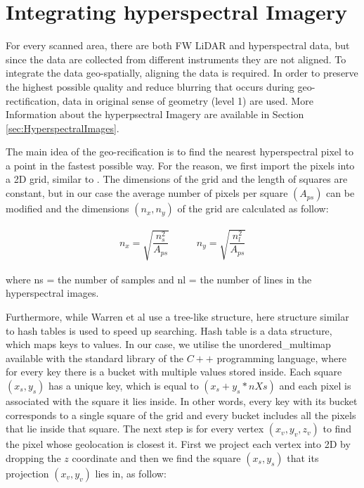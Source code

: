 \documentclass{subfiles}
\begin{document}
	
\section{Integrating hyperspectral Imagery}


	\par For every scanned area, there are both FW LiDAR and hyperspectral data, but since the data are collected from different instruments they are not aligned. To integrate the data geo-spatially, aligning the data is required. In order to preserve the highest possible quality and reduce blurring that occurs during geo-rectification, data in original sense of geometry (level 1) are used. More Information about the hyperpsectral Imagery are available in Section \ref{sec:HyperspectralImages}.
	
	\par The main idea of the geo-recification is to find the nearest hyperspectral pixel to a point in the fastest possible way. For the reason, we first import the pixels into a 2D grid, similar to \cite{Warren2014}. The dimensions of the grid and the length of squares are constant, but in our case the average number of pixels per square $(A_{ps})$ can be modified and the dimensions $(n_x, n_y)$ of the grid are calculated as follow:
	
	\begin{eqnarray}
		n_x=\sqrt{\dfrac{n_s^2}{A_{ps}}} \;\;\;\;\;\;\;\;\;\; n_y=\sqrt{\dfrac{n_l^2}{A_{ps}}}   
	\end{eqnarray} 
	
	
	
	 	
	
	\par where ns = the number of samples and
	nl = the number of lines in the hyperspectral images.
	
	\par Furthermore, while Warren et al use a tree-like structure, here  structure similar to hash tables is used to speed up searching. Hash table is a data structure, which maps keys to values. In our case, we utilise the unordered\_multimap available with the standard library of the $C++$ programming language, where for every key there is a bucket with multiple values stored inside. Each square $(x_s,y_s)$	has a unique key, which is equal to $(x_s + y_s *nXs)$ and each pixel is associated with the square it lies inside. In other words, every key with its bucket corresponds to a single square of the grid and every bucket includes all the pixels that lie inside that square. The next step is for every vertex $(x_v, y_v, z_v)$ to find the pixel whose geolocation is closest it. First we project each vertex into 2D by dropping the $z$ coordinate and then we find the square $(x_s , y_s )$ that its projection $(x_v , y_v)$ lies in, as follow:
	
\end{document}
